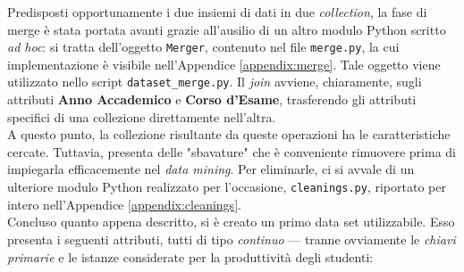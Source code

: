 		Predisposti opportunamente i due insiemi di dati in due \textit{collection}, la fase di merge è stata portata avanti grazie all'ausilio di un altro modulo Python scritto \textit{ad hoc}: si tratta dell'oggetto \texttt{Merger}, contenuto nel file \texttt{merge.py}, la cui implementazione è visibile nell'Appendice \ref{appendix:merge}. Tale oggetto viene utilizzato nello script \texttt{dataset\_merge.py}. Il \textit{join} avviene, chiaramente, sugli attributi \textbf{Anno Accademico} e \textbf{Corso d'Esame}, trasferendo gli attributi specifici di una collezione direttamente nell'altra. \\

		A questo punto, la collezione risultante da queste operazioni ha le caratteristiche cercate. Tuttavia, presenta delle "sbavature" che è conveniente rimuovere prima di impiegarla efficacemente nel \textit{data mining}. Per eliminarle, ci si avvale di un ulteriore modulo Python realizzato per l'occasione, \texttt{cleanings.py}, riportato per intero nell'Appendice \ref{appendix:cleanings}. \\

		Concluso quanto appena descritto, si è creato un primo data set utilizzabile. Esso presenta i seguenti attributi, tutti di tipo	\textit{continuo} --- tranne ovviamente le \textit{chiavi primarie} e le istanze considerate per la produttività degli studenti:

